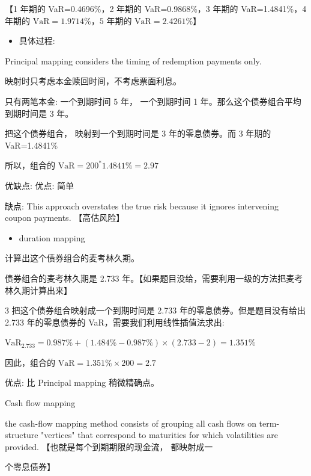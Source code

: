     【1 年期的 VaR=0.4696\%，2 年期的 VaR=0.9868\%，3 年期的 VaR=1.4841\%，4 年期的 \(\mathrm{{VaR}} = {1.9714}\% ，5\) 年期的 \(\mathrm{{VaR}} = {2.4261}\%  \)】
    
    \begin{itemize}
    \item 具体过程:
    \end{itemize}
    
     Principal mapping considers the timing of redemption payments only.
    
     映射时只考虑本金赎回时间，不考虑票面利息。
    
     只有两笔本金: 一个到期时间 5 年， 一个到期时间 1 年。那么这个债券组合平均到期时间是 3 年。
    
     把这个债券组合， 映射到一个到期时间是 3 年的零息债券。而 3 年期的 VaR=1.4841\%
    
    所以，组合的 \(\mathrm{{VaR}} = {200}^{ * }{1.4841}\%  = {2.97}\)
    
     优缺点: 优点: 简单
    
    缺点: This approach overstates the true risk because it ignores intervening coupon payments. 【高估风险】
    
    \begin{itemize}
    \item duration mapping
    \end{itemize}
    
     计算出这个债券组合的麦考林久期。
    
     债券组合的麦考林久期是 2.733 年。【如果题目没给，需要利用一级的方法把麦考林久期计算出来】
    
    3 把这个债券组合映射成一个到期时间是 2.733 年的零息债券。但是题目没有给出 2.733 年的零息债券的 VaR，需要我们利用线性插值法求出:
    
    \({\mathrm{{VaR}}}_{2.733} = {0.987}\%  + \left( {{1.484}\%  - {0.987}\% }\right)  \times  \left( {{2.733} - 2}\right)  = {1.351}\%\)
    
     因此，组合的 \(\mathrm{{VaR}} = {1.351}\%  \times  {200} = {2.7}\)
    
     优点: 比 Principal mapping 稍微精确点。
    
    Cash flow mapping
    
     the cash-flow mapping method consists of grouping all cash flows on term-structure "vertices" that correspond to maturities for which volatilities are provided. 【也就是每个到期期限的现金流， 都映射成一
    
    个零息债券】
    
